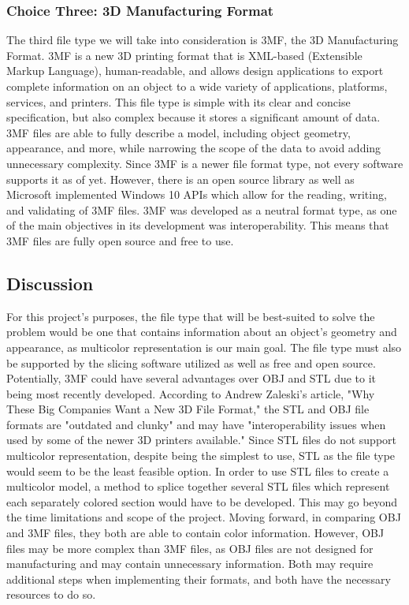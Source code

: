 \documentclass[letterpaper, onecolumn, draftclsnofoot, 10pt, compsoc]{IEEEtran}
\begin{document}
\begin{singlespace}
\subsubsection{Choice Three: 3D Manufacturing Format}
The third file type we will take into consideration is 3MF, the 3D Manufacturing Format.
3MF is a new 3D printing format that is XML-based (Extensible Markup Language), human-readable, and allows design applications to export complete information on an object to a wide variety of applications, platforms, services, and printers. \cite{3mfweb}
This file type is simple with its clear and concise specification, but also complex because it stores a significant amount of data.
3MF files are able to fully describe a model, including object geometry, appearance, and more, while narrowing the scope of the data to avoid adding unnecessary complexity. 
Since 3MF is a newer file format type, not every software supports it as of yet.
However, there is an open source library as well as Microsoft implemented Windows 10 APIs which allow for the reading, writing, and validating of 3MF files. 
3MF was developed as a neutral format type, as one of the main objectives in its development was interoperability.
This means that 3MF files are fully open source and free to use. \cite{3mfweb}
\subsection{Discussion}
For this project's purposes, the file type that will be best-suited to solve the problem would be one that contains information about an object's geometry and appearance, as multicolor representation is our main goal.
The file type must also be supported by the slicing software utilized as well as free and open source.
Potentially, 3MF could have several advantages over OBJ and STL due to it being most recently developed.
According to Andrew Zaleski's article, "Why These Big Companies Want a New 3D File Format," the STL and OBJ file formats are "outdated and clunky" and may have "interoperability issues when used by some of the newer 3D printers available." \cite{newformatweb}
Since STL files do not support multicolor representation, despite being the simplest to use, STL as the file type would seem to be the least feasible option.
In order to use STL files to create a multicolor model, a method to splice together several STL files which represent each separately colored section would have to be developed. This may go beyond the time limitations and scope of the project. 
Moving forward, in comparing OBJ and 3MF files, they both are able to contain color information.
However, OBJ files may be more complex than 3MF files, as OBJ files are not designed for manufacturing and may contain unnecessary information. \cite{3mfweb}
Both may require additional steps when implementing their formats, and both have the necessary resources to do so.


\end{singlespace}
\end{document}
